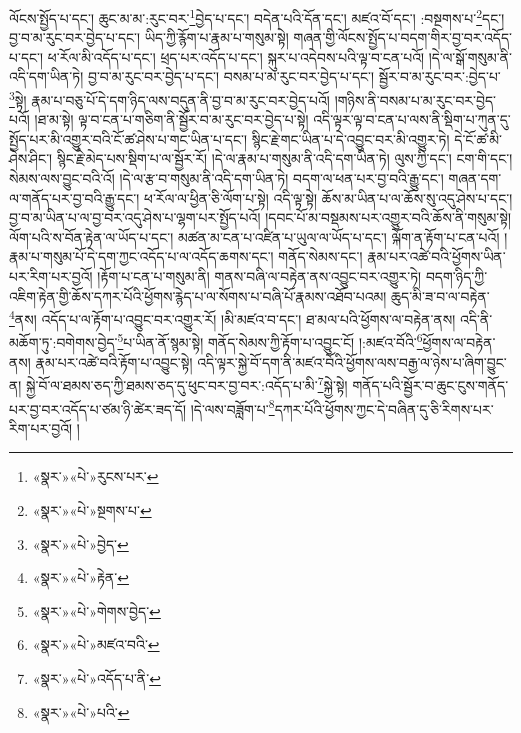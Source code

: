 ལོངས་སྤྱོད་པ་དང་། ཆུང་མ་མ་:རུང་བར་\footnote{«སྣར་»«པེ་»རུངས་པར་}བྱེད་པ་དང་། བདེན་པའི་དོན་དང་། མཛའ་བོ་དང་། :བསྔགས་པ་\footnote{«སྣར་»«པེ་»སྔགས་པ་}དང་། བྱ་བ་མ་རུང་བར་བྱེད་པ་དང་། ཡིད་ཀྱི་རྙོག་པ་རྣམ་པ་གསུམ་སྟེ། གཞན་གྱི་ལོངས་སྤྱོད་པ་བདག་གིར་བྱ་བར་འདོད་པ་དང་། ཕ་རོལ་མི་འདོད་པ་དང་། ཕྲད་པར་འདོད་པ་དང་། སྐུར་པ་འདེབས་པའི་ལྟ་བ་ངན་པའོ། །དེ་ལ་སྒོ་གསུམ་ནི་འདི་དག་ཡིན་ཏེ། བྱ་བ་མ་རུང་བར་བྱེད་པ་དང་། བསམ་པ་མ་རུང་བར་བྱེད་པ་དང་། སྦྱོར་བ་མ་རུང་བར་:བྱེད་པ་\footnote{«སྣར་»«པེ་»བྱེད་}སྟེ། རྣམ་པ་བཅུ་པོ་དེ་དག་ཉིད་ལས་བདུན་ནི་བྱ་བ་མ་རུང་བར་བྱེད་པའོ། །གཉིས་ནི་བསམ་པ་མ་རུང་བར་བྱེད་པའོ། །ཐ་མ་སྟེ། ལྟ་བ་ངན་པ་གཅིག་ནི་སྦྱོར་བ་མ་རུང་བར་བྱེད་པ་སྟེ། འདི་ལྟར་ལྟ་བ་ངན་པ་ལས་ནི་སྡིག་པ་ཀུན་དུ་སྤྱོད་པར་མི་འགྱུར་བའི་ངོ་ཚ་ཤེས་པ་གང་ཡིན་པ་དང་། སྙིང་རྗེ་གང་ཡིན་པ་དེ་འབྱུང་བར་མི་འགྱུར་ཏེ། དེ་ངོ་ཚ་མི་ཤེས་ཤིང་། སྙིང་རྗེ་མེད་པས་སྡིག་པ་ལ་སྦྱོར་རོ། །དེ་ལ་རྣམ་པ་གསུམ་ནི་འདི་དག་ཡིན་ཏེ། ལུས་ཀྱི་དང་། ངག་གི་དང་། སེམས་ལས་བྱུང་བའི་འོ། །དེ་ལ་རྩ་བ་གསུམ་ནི་འདི་དག་ཡིན་ཏེ། བདག་ལ་ཕན་པར་བྱ་བའི་རྒྱུ་དང་། གཞན་དག་ལ་གནོད་པར་བྱ་བའི་རྒྱུ་དང་། ཕ་རོལ་ལ་ཕྱིན་ཅི་ལོག་པ་སྟེ། འདི་ལྟ་སྟེ། ཆོས་མ་ཡིན་པ་ལ་ཆོས་སུ་འདུ་ཤེས་པ་དང་། བྱ་བ་མ་ཡིན་པ་ལ་བྱ་བར་འདུ་ཤེས་པ་ལྷག་པར་སྤྱོད་པའོ། །དབང་པོ་མ་བསྡམས་པར་འགྱུར་བའི་ཆོས་ནི་གསུམ་སྟེ། ལོག་པའི་ས་བོན་རྟེན་ལ་ཡོད་པ་དང་། མཚན་མ་ངན་པ་འཛིན་པ་ཡུལ་ལ་ཡོད་པ་དང་། ལྐོག་ན་རྟོག་པ་ངན་པའོ། །རྣམ་པ་གསུམ་པོ་དེ་དག་ཀྱང་འདོད་པ་ལ་འདོད་ཆགས་དང་། གནོད་སེམས་དང་། རྣམ་པར་འཚེ་བའི་ཕྱོགས་ཡིན་པར་རིག་པར་བྱའོ། །རྟོག་པ་ངན་པ་གསུམ་ནི། གནས་བཞི་ལ་བརྟེན་ནས་འབྱུང་བར་འགྱུར་ཏེ། བདག་ཉིད་ཀྱི་འཇིག་རྟེན་གྱི་ཆོས་དཀར་པོའི་ཕྱོགས་རྙེད་པ་ལ་སོགས་པ་བཞི་པོ་རྣམས་འཐོབ་པའམ། ཆུད་མི་ཟ་བ་ལ་བརྟེན་\footnote{«སྣར་»«པེ་»རྟེན་}ནས། འདོད་པ་ལ་རྟོག་པ་འབྱུང་བར་འགྱུར་རོ། །མི་མཛའ་བ་དང་། ཐ་མལ་པའི་ཕྱོགས་ལ་བརྟེན་ནས། འདི་ནི་མཆོག་ཏུ་:བགེགས་བྱེད་\footnote{«སྣར་»«པེ་»གེགས་བྱེད་}པ་ཡིན་ནོ་སྙམ་སྟེ། གནོད་སེམས་ཀྱི་རྟོག་པ་འབྱུང་ངོ། །:མཛའ་བོའི་\footnote{«སྣར་»«པེ་»མཛའ་བའི་}ཕྱོགས་ལ་བརྟེན་ནས། རྣམ་པར་འཚེ་བའི་རྟོག་པ་འབྱུང་སྟེ། འདི་ལྟར་སྐྱེ་བོ་དག་ནི་མཛའ་བོའི་ཕྱོགས་ལས་བརྒྱ་ལ་ཉེས་པ་ཞིག་བྱུང་ན། སྐྱེ་བོ་ལ་ཐམས་ཅད་ཀྱི་ཐམས་ཅད་དུ་ཕུང་བར་བྱ་བར་:འདོད་པ་མི་\footnote{«སྣར་»«པེ་»འདོད་པ་ནི་}སྐྱེ་སྟེ། གནོད་པའི་སྦྱོར་བ་ཆུང་ངུས་གནོད་པར་བྱ་བར་འདོད་པ་ཙམ་ཉི་ཚེར་ཟད་དོ། །དེ་ལས་བཟློག་པ་\footnote{«སྣར་»«པེ་»པའི་}དཀར་པོའི་ཕྱོགས་ཀྱང་དེ་བཞིན་དུ་ཅི་རིགས་པར་རིག་པར་བྱའོ། །
